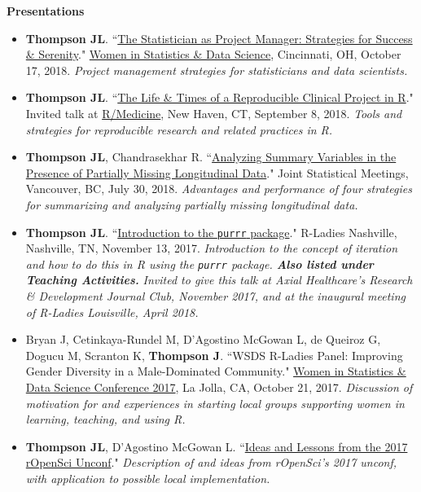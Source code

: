 \documentclass[5pt]{article}
\begin{document}
\noindent \textbf{Presentations}
\begin{itemize}
\item \textbf{Thompson JL}. ``\href{https://jenthompson.me/slides/WSDS2018.pdf}{The Statistician as Project Manager: Strategies for Success \& Serenity}." \href{https://ww2.amstat.org/meetings/wsds/2018/}{Women in Statistics \& Data Science}, Cincinnati, OH, October 17, 2018. \emph{Project management strategies for statisticians and data scientists.}
\item \textbf{Thompson JL}. ``\href{https://jenthompson.me/slides/rmedicine2018/rmedicine2018}{The Life \& Times of a Reproducible Clinical Project in R}." Invited talk at \href{https://r-medicine.com}{R/Medicine}, New Haven, CT, September 8, 2018. \emph{Tools and strategies for reproducible research and related practices in R.}
\item \textbf{Thompson JL}, Chandrasekhar R. ``\href{https://jenthompson.me/slides/jsm2018/jsm2018}{Analyzing Summary Variables in the Presence of Partially Missing Longitudinal Data}." Joint Statistical Meetings, Vancouver, BC, July 30, 2018. \emph{Advantages and performance of four strategies for summarizing and analyzing partially missing longitudinal data.}
\item \textbf{Thompson JL}. ``\href{github.com/jenniferthompson/RLadiesIntroToPurrr}{Introduction to the \texttt{purrr} package}." R-Ladies Nashville, Nashville, TN, November 13, 2017. \emph{Introduction to the concept of iteration and how to do this in R using the \texttt{purrr} package. \textbf{Also listed under Teaching Activities.}}
\indent \emph{Invited to give this talk at Axial Healthcare's Research \& Development Journal Club, November 2017, and at the inaugural meeting of R-Ladies Louisville, April 2018.}
\item Bryan J, Cetinkaya-Rundel M, D'Agostino McGowan L, de Queiroz G, Dogucu M, Scranton K, \textbf{Thompson J}. ``WSDS R-Ladies Panel: Improving Gender Diversity in a Male-Dominated Community." \href{https://ww2.amstat.org/meetings/wsds/2017/onlineprogram/AbstractDetails.cfm?AbstractID=303812}{Women in Statistics \& Data Science Conference 2017}, La Jolla, CA, October 21, 2017. \emph{Discussion of motivation for and experiences in starting local groups supporting women in learning, teaching, and using R.}
\item \textbf{Thompson JL}, D'Agostino McGowan L. ``\href{https://tinyurl.com/vubiostat-runconf17}{Ideas and Lessons from the 2017 rOpenSci Unconf}." \emph{Description of and ideas from rOpenSci's 2017 unconf, with application to possible local implementation.}

\end{itemize}
\end{document}

